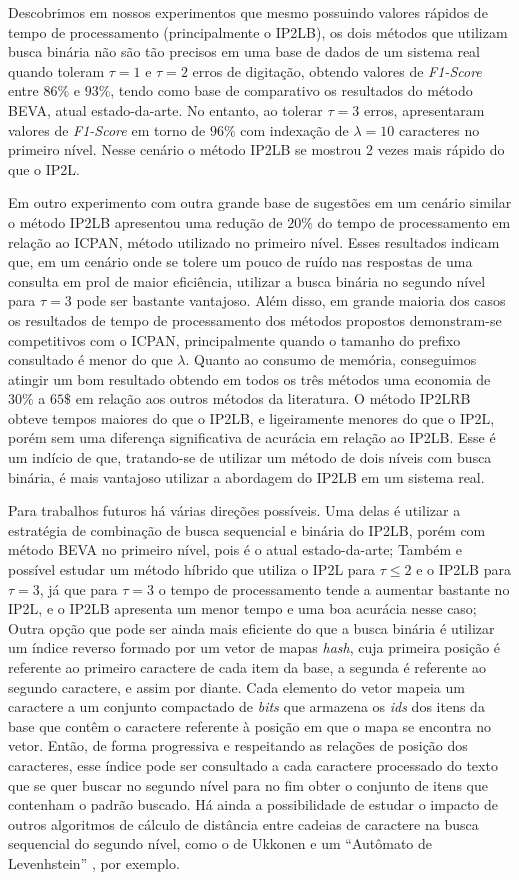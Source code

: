 Descobrimos em nossos experimentos que mesmo possuindo valores rápidos de tempo de processamento (principalmente o IP2LB), os dois métodos que utilizam busca binária não são tão precisos em uma base de dados de um sistema real quando toleram $\tau=1$ e $\tau=2$ erros de digitação, obtendo valores de \textit{F1-Score} entre $86\%$ e $93\%$, tendo como base de comparativo os resultados do método BEVA, atual estado-da-arte. No entanto, ao tolerar $\tau=3$ erros, apresentaram valores de \textit{F1-Score} em torno de $96\%$ com indexação de $\lambda=10$ caracteres no primeiro nível. Nesse cenário o método IP2LB se mostrou 2 vezes mais rápido do que o IP2L. 

Em outro experimento com outra grande base de sugestões em um cenário similar o método IP2LB apresentou uma redução de $20\%$ do tempo de processamento em relação ao ICPAN, método utilizado no primeiro nível. Esses resultados indicam que, em um cenário onde se tolere um pouco de ruído nas respostas de uma consulta em prol de maior eficiência, utilizar a busca binária no segundo nível para $\tau=3$ pode ser bastante vantajoso. Além disso, em grande maioria dos casos os resultados de tempo de processamento dos métodos propostos demonstram-se competitivos com o ICPAN, principalmente quando o tamanho do prefixo consultado é menor do que $\lambda$. Quanto ao consumo de memória, conseguimos atingir um bom resultado obtendo em todos os três métodos uma economia de $30\%$ a $65\$$ em relação aos outros métodos da literatura. O método IP2LRB obteve tempos maiores do que o IP2LB, e ligeiramente menores do que o IP2L, porém sem uma diferença significativa de acurácia em relação ao IP2LB. Esse é um indício de que, tratando-se de utilizar um método de dois níveis com busca binária, é mais vantajoso utilizar a abordagem do IP2LB em um sistema real. 

Para trabalhos futuros há várias direções possíveis. Uma delas é utilizar a estratégia de combinação de busca sequencial e binária do IP2LB, porém com método BEVA no primeiro nível, pois é o atual estado-da-arte; Também e possível estudar um método híbrido que utiliza o IP2L para $\tau \leq 2$ e o IP2LB para $\tau = 3$, já que para $\tau=3$ o tempo de processamento tende a aumentar bastante no IP2L, e o IP2LB apresenta um menor tempo e uma boa acurácia nesse caso; Outra opção que pode ser ainda mais eficiente do que a busca binária é utilizar um índice reverso formado por um vetor de mapas \textit{hash}, cuja primeira posição é referente ao primeiro caractere de cada item da base, a segunda é referente ao segundo caractere, e assim por diante. Cada elemento do vetor mapeia um caractere a um conjunto compactado de \textit{bits} que armazena os \textit{ids} dos itens da base que contêm o caractere referente à posição em que o mapa se encontra no vetor. Então, de forma progressiva e respeitando as relações de posição dos caracteres, esse índice pode ser consultado a cada caractere processado do texto que se quer buscar no segundo nível para no fim obter o conjunto de itens que contenham o padrão buscado. Há ainda a possibilidade de estudar o impacto de outros algoritmos de cálculo de distância entre cadeias de caractere na busca sequencial do segundo nível, como o de Ukkonen \citep{ukkonen1985algorithms} e um ``Autômato de Levenhstein'' \citep{schulz2002fast}, por exemplo.